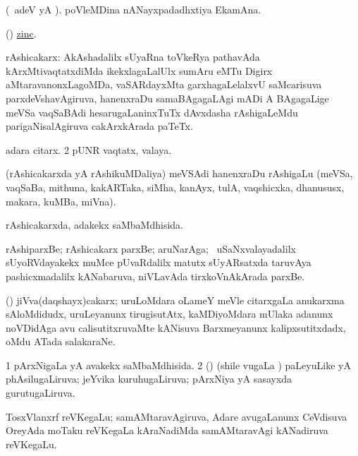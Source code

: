\bentry
{} 
\gl{\nA} 
\bmng
(\bava\ adeV yA ).
poVleMDina nANayxpadadhxtiya EkamAna. 
\emng 
\eentry

\bentry
{}
\gl{\saMkeV} 
\bmng
(\ravi) \hyperlink{zinc(1)}{zinc}.
\emng
\eentry

\bentry
{} 
\gl{\nA}
\bmng
\bnum
{} rAshicakarx:
\banum
{} AkAshadalilx sUyaRna toVkeRya pathavAda kArxMtivaqtatxdiMda ikekxlagaLalUlx sumAru eMTu Digirx aMtaravanonxLagoMDa, vaSARdayxMta garxhagaLelalxvU saMcarisuva parxdeVshavAgiruva, hanenxraDu samaBAgagaLAgi mADi A BAgagaLige meVSa vaqSaBAdi hesarugaLaninxTuTx dAvxdasha rAshigaLeMdu parigaNisalAgiruva cakArxkArada paTeTx.  

  adara citarx.  
\eanum
\numie
\num{2}  pUNR vaqtatx, valaya.
\enum
\emng

\noindent
\gl{\pagu} 
\bmng
{} (rAshicakarxda yA rAshikuMDaliya) meVSAdi hanenxraDu rAshigaLu (meVSa, vaqSaBa, mithuna, kakARTaka, siMha, kanAyx, tulA, vaqshicxka, dhanususx, makara, kuMBa, miVna).  
\emng
\eentry

\bentry
{} 
\gl{\gu} 
\bmng
rAshicakarxda, adakekx saMbaMdhisida.
\emng
\eentry

\bentry
{} 
\gl{\nA} 
\bmng
rAshiparxBe; rAshicakarx parxBe; aruNarAga; \kanmu\ uSaNxvalayadalilx sUyoRVdayakekx muMce pUvaRdalilx matutx sUyARsatxda taruvAya pashicxmadalilx kANabaruva, niVLavAda tirxkoVnAkArada parxBe.
\emng
\eentry

\bentry
{} 
\gl{\nA}  
\bmng
(\ca) jiVva(daqshayx)cakarx; uruLoMdara oLameY meVle citarxgaLa anukarxma sAloMdidudx, uruLeyanunx tirugisutAtx, kaMDiyoMdara mUlaka adanunx noVDidAga avu calisutitxruvaMte kANisuva Barxmeyanunx kalipxsutitxdadx, oMdu ATada salakaraNe.
\emng
\eentry

\bentry
{} 
\gl{\gu} 
\bmng
\bnum
\num{1} pArxNigaLa yA avakekx saMbaMdhisida. 
\num{2} (\BUvi) (shile \mo vugaLa \vi) paLeyuLike yA phAsilugaLiruva; jeYvika kuruhugaLiruva; pArxNiya yA sasayxda gurutugaLiruva.
\enum
\emng
\eentry

\bentry
{} 
\gl{\nA}
\bmng
TosxVlanxrf reVKegaLu; samAMtaravAgiruva, Adare avugaLanunx  CeVdisuva OreyAda moTaku reVKegaLa kAraNadiMda  samAMtaravAgi kANadiruva  reVKegaLu.  
\emng
\eentry

